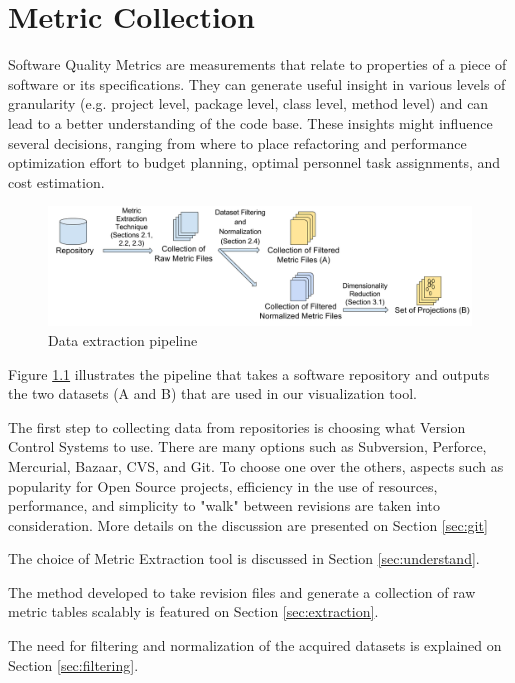\chapter{Metric Collection} \label{sec:metrics}

Software Quality Metrics are measurements that relate to properties of a piece of software or its specifications. They can generate useful insight in various levels of granularity (e.g. project level, package level, class level, method level) and can lead to a better understanding of the code base. These insights might influence several decisions, ranging from where to place refactoring and performance optimization effort to budget planning, optimal personnel task assignments, and cost estimation.

\begin{figure}[H]
	\centering
	\includegraphics[width=\textwidth]{figures/pipeline.png}
	\caption{Data extraction pipeline}
	\label{fig:data_pipeline}
\end{figure}

Figure \ref{fig:data_pipeline} illustrates the pipeline that takes a software repository and outputs the two datasets (A and B) that are used in our visualization tool.

The first step to collecting data from repositories is choosing what Version Control Systems to use. There are many options such as Subversion, Perforce, Mercurial, Bazaar, CVS, and Git. To choose one over the others, aspects such as popularity for Open Source projects, efficiency in the use of resources, performance, and simplicity to "walk" between revisions are taken into consideration. More details on the discussion are presented on Section \ref{sec:git}

The choice of Metric Extraction tool is discussed in Section \ref{sec:understand}.

The method developed to take revision files and generate a collection of raw metric tables scalably is featured on Section \ref{sec:extraction}.

The need for filtering and normalization of the acquired datasets is explained on Section \ref{sec:filtering}.

